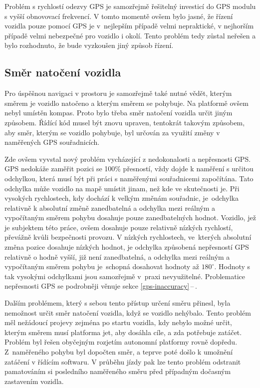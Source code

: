 \documentclass[czech, bachelor]{diploma}
\newcommand{\peteref}[1]{\ref{#1}\,--\,\nameref{#1}}
\begin{document}
Problém s rychlostí odezvy GPS je samozřejmě řešitelný investicí do GPS modulu s vyšší obnovovací frekvencí. V tomto momentě ovšem
bylo jasné, že řízení vozidla pouze pomocí GPS je v~nejlepším případě velmi nepraktické, v nejhorším případě velmi nebezpečné
pro vozidlo i okolí. Tento problém tedy zůstal neřešen a bylo rozhodnuto, že bude vyzkoušen jiný způsob řízení.

\subsection{Směr natočení vozidla} \label{directions-and-angles}

Pro úspěšnou navigaci v prostoru je samozřejmě také nutné vědět, kterým směrem je vozidlo natočeno a kterým směrem se pohybuje.
Na platformě ovšem nebyl umístěn kompas. Proto bylo třeba směr natočení vozidla určit jiným způsobem. Řídící kód musel být znovu
upraven, tentokrát takovým způsobem, aby směr, kterým se vozidlo pohybuje, byl určován za využití změny v naměřených GPS
souřadnicích.

Zde ovšem vyvstal nový problém vycházející z nedokonalosti a nepřesnosti GPS. GPS nedokáže zaměřit pozici se 100\% přesností,
vždy dojde k naměření s určitou odchylkou, která musí být při práci s naměřenými souřadnicemi započítána. Tato odchylka může
vozidlo na mapě umístit jinam, než kde ve skutečnosti je. Při vysokých rychlostech, kdy dochází k velkým změnám souřadnic,
je~odchylka relativně k absolutní změně zanedbatelná a odchylka mezi reálným a vypočítaným směrem pohybu dosahuje pouze
zanedbatelných hodnot. Vozidlo, jež je subjektem této práce, ovšem dosahuje pouze relativně nízkých rychlostí, převážně kvůli
bezpečnosti provozu. V nízkých rychlostech, ve~kterých absolutní změna pozice dosahuje nízkých hodnot, je odchylka způsobená
nepřesností GPS relativně o hodně vyšší, již není zanedbatelná, a odchylka mezi reálným a vypočítaným směrem pohybu je~schopná
dosahovat hodnoty až $180^{\circ}$. Hodnoty s tak vysokými odchylkami jsou samozřejmě v~praxi nevyužitelné. Problematice
nepřesnosti GPS se podrobněji věnuje sekce \peteref{gps-inaccuracy}.

Dalším problémem, který s sebou tento přístup určení směru přinesl, byla nemožnost určit směr natočení vozidla, když se vozidlo
nehýbalo. Tento problém měl nežádoucí projevy zejména po startu vozidla, kdy nebylo možné určit, kterým směrem musí platforma jet,
aby dosáhla cíle, a zda potřebuje zatáčet. Problém byl řešen obyčejným rozjetím autonomní platformy rovně dopředu. Z~naměřeného
pohybu byl dopočten směr, a teprve poté došlo k umožnění zatáčení v řídícím softwaru. V průběhu jízdy pak lze tento problém
odstranit pamatováním si posledního naměřeného směru před případným dočasným zastavením vozidla.
\end{document}
